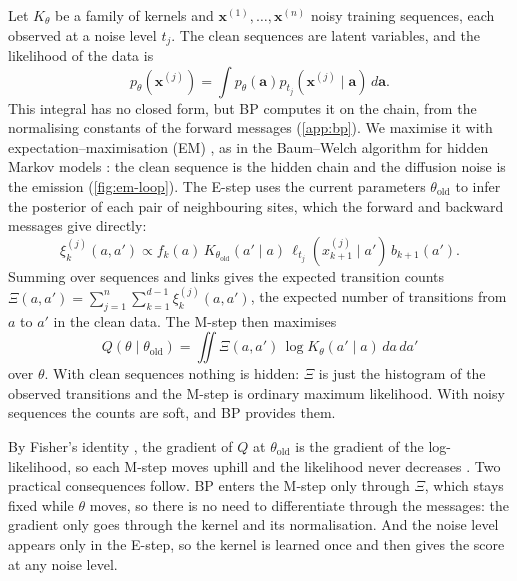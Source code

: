 \documentclass{article}
\begin{document}
Let $K_\theta$ be a family of kernels and $\mathbf{x}^{(1)},\ldots,\mathbf{x}^{(n)}$ noisy training sequences, each
observed at a noise level $t_j$. The clean sequences are latent variables, and the likelihood of the data is
\begin{equation}
    p_\theta(\mathbf{x}^{(j)})
    =
    \int
    p_\theta(\mathbf{a})
    p_{t_j}(\mathbf{x}^{(j)}\mid\mathbf{a})
    \,d\mathbf{a}.
\end{equation}
This integral has no closed form, but BP computes it on the chain, from the normalising constants of the forward
messages (\cref{app:bp}). We maximise it with expectation--maximisation (EM) \cite{dempster1977maximum}, as in the
Baum--Welch algorithm for hidden Markov models \cite{baum1970,rabiner1989tutorial}: the clean sequence is the hidden
chain and the diffusion noise is the emission (\cref{fig:em-loop}). The E-step uses the current parameters
$\theta_{\mathrm{old}}$ to infer the posterior of each pair of neighbouring sites, which the forward and backward
messages give directly:
\begin{equation}
    \xi_k^{(j)}(a,a')
    \propto
    f_k(a)\,
    K_{\theta_{\mathrm{old}}}(a'\mid a)\,
    \ell_{t_j}(x_{k+1}^{(j)}\mid a')\,
    b_{k+1}(a').
    \label{eq:pairwise-posterior}
\end{equation}
Summing over sequences and links gives the expected transition counts
$\Xi(a,a')=\sum_{j=1}^{n}\sum_{k=1}^{d-1}\xi_k^{(j)}(a,a')$, the expected number of transitions from $a$ to $a'$ in the
clean data. The M-step then maximises
\begin{equation}
    Q(\theta\mid\theta_{\mathrm{old}})
    =
    \iint
    \Xi(a,a')\,
    \log K_\theta(a'\mid a)
    \,da\,da'
    \label{eq:em-objective}
\end{equation}
over $\theta$. With clean sequences nothing is hidden: $\Xi$ is just the histogram of the observed transitions and the
M-step is ordinary maximum likelihood. With noisy sequences the counts are soft, and BP provides them.

By Fisher's identity \cite{louis1982,cappe2005}, the gradient of $Q$ at $\theta_{\mathrm{old}}$ is the gradient of the
log-likelihood, so each M-step moves uphill and the likelihood never decreases \cite{dempster1977maximum,wu1983}. Two
practical consequences follow. BP enters the M-step only through $\Xi$, which stays fixed while $\theta$ moves, so there
is no need to differentiate through the messages: the gradient only goes through the kernel and its normalisation. And
the noise level appears only in the E-step, so the kernel is learned once and then gives the score at any noise level.
\end{document}
